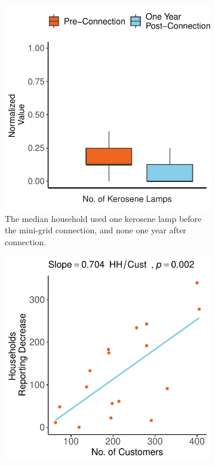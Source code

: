 \begin{figure}[th]
	\centering
	\begin{subfigure}[t]{0.48\textwidth}
		\centering
		\includegraphics[width=\textwidth]{images/health_paired_results.pdf}
		\caption{The median household used one kerosene lamp before the mini-grid connection, and none one year after connection.}
		\label{fig:paired-kerosene}
	\end{subfigure}
	\hfill
	\begin{subfigure}[t]{0.48\textwidth}
		\centering
		\includegraphics[width=\textwidth]{images/kerosene_lamp_usage_change_regression_community.pdf}

\end{subfigure}
\end{figure}
